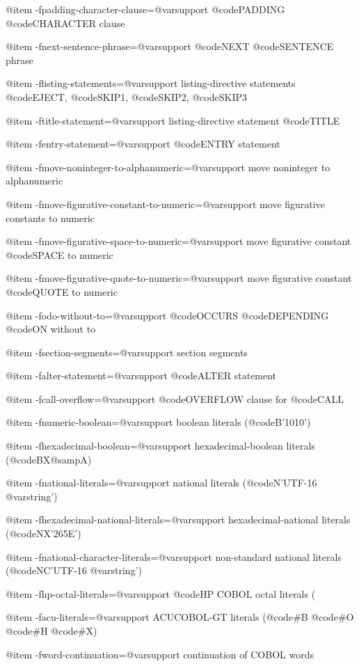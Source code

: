 @item -fpadding-character-clause=@var{support}
@code{PADDING} @code{CHARACTER} clause

@item -fnext-sentence-phrase=@var{support}
@code{NEXT} @code{SENTENCE} phrase

@item -flisting-statements=@var{support}
listing-directive statements @code{EJECT}, @code{SKIP1}, @code{SKIP2}, @code{SKIP3}

@item -ftitle-statement=@var{support}
listing-directive statement @code{TITLE}

@item -fentry-statement=@var{support}
@code{ENTRY} statement

@item -fmove-noninteger-to-alphanumeric=@var{support}
move noninteger to alphanumeric

@item -fmove-figurative-constant-to-numeric=@var{support}
move figurative constants to numeric

@item -fmove-figurative-space-to-numeric=@var{support}
move figurative constant @code{SPACE} to numeric

@item -fmove-figurative-quote-to-numeric=@var{support}
move figurative constant @code{QUOTE} to numeric

@item -fodo-without-to=@var{support}
@code{OCCURS} @code{DEPENDING} @code{ON} without to

@item -fsection-segments=@var{support}
section segments

@item -falter-statement=@var{support}
@code{ALTER} statement

@item -fcall-overflow=@var{support}
@code{OVERFLOW} clause for @code{CALL}

@item -fnumeric-boolean=@var{support}
boolean literals (@code{B'1010'})

@item -fhexadecimal-boolean=@var{support}
hexadecimal-boolean literals (@code{BX@samp{A}})

@item -fnational-literals=@var{support}
national literals (@code{N'UTF-16 @var{string}'})

@item -fhexadecimal-national-literals=@var{support}
hexadecimal-national literals (@code{NX'265E'})

@item -fnational-character-literals=@var{support}
non-standard national literals (@code{NC'UTF-16 @var{string}'})

@item -fhp-octal-literals=@var{support}
@code{HP} COBOL octal literals (%

@item -facu-literals=@var{support}
ACUCOBOL-GT literals (@code{#B} @code{#O} @code{#H} @code{#X})

@item -fword-continuation=@var{support}
continuation of COBOL words

